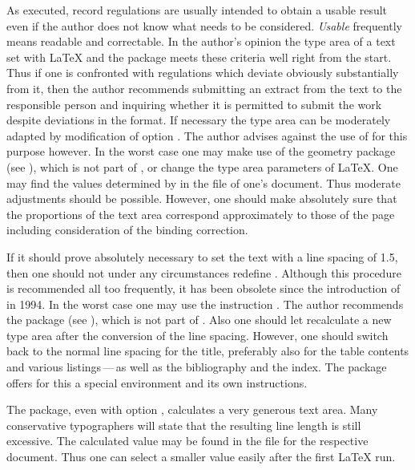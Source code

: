 As executed, record regulations are usually intended to obtain a
usable result even if the author does not know what needs to be
considered. \emph{Usable} frequently means readable and correctable.  In
the author's opinion the type area of a text set with {\LaTeX} and the
 package meets these criteria well right from the
start.  Thus if one is confronted with regulations which deviate
obviously substantially from it, then the author recommends submitting
an extract from the text to the responsible person and inquiring
whether it is permitted to submit the work despite deviations in the
format.  If necessary the type area can be moderately adapted by
modification of option .  The author advises against the
use of  for this purpose however.  In the worst case
one may make use of the geometry package (see
\cite{package:geometry}), which is not part of \KOMAScript, or change
the type area parameters of \LaTeX.  One may find the values
determined by  in the  file of one's
document.  Thus moderate adjustments should be possible.  However, one
should make absolutely sure that the proportions of the text area
correspond approximately to those of the page including consideration
of the binding correction.

If it should prove absolutely necessary to set the text with a line
spacing of 1.5, then one should not under any circumstances redefine
.  Although this procedure is recommended all
too frequently, it has been obsolete since the introduction of
{\LaTeXe} in 1994.  In the worst case one may use the instruction
.  The author recommends the package
 (see
\cite{package:setspace}), which is not part of \KOMAScript.  Also one
should let  recalculate a new type area after the
conversion of the line spacing.  However, one should switch back to
the normal line spacing for the title, preferably also for the table
contents and various listings\,---\,as well as the bibliography and
the index.  The  package offers for this a special
environment and its own instructions.

The  package, even with option ,
calculates a very generous text area.  Many conservative typographers
will state that the resulting line length is still excessive. The
calculated  value may be found in the  file for the
respective document.  Thus one can select a smaller value easily after
the first {\LaTeX} run.

